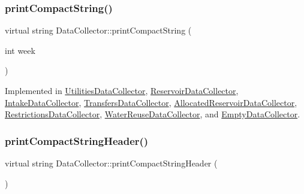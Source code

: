 \mbox{\label{classDataCollector_a2eac264fa5612aed5a830b12de4f4ae3}} 
\subsubsection{\texorpdfstring{print\+Compact\+String()}{printCompactString()}}
{\footnotesize\ttfamily virtual string Data\+Collector\+::print\+Compact\+String (\begin{DoxyParamCaption}\item[{int}]{week }\end{DoxyParamCaption})\hspace{0.3cm}{\ttfamily [pure virtual]}}



Implemented in \mbox{\hyperlink{classUtilitiesDataCollector_a57b5f9cd8ddf54154476749ab0977355}{Utilities\+Data\+Collector}}, \mbox{\hyperlink{classReservoirDataCollector_a0b68d7fa4a6d704350340d1ac3e8a1d2}{Reservoir\+Data\+Collector}}, \mbox{\hyperlink{classIntakeDataCollector_ac39a40726fd4fe887425b24a10f04034}{Intake\+Data\+Collector}}, \mbox{\hyperlink{classTransfersDataCollector_aa5385877143c67a4d300032160239cfe}{Transfers\+Data\+Collector}}, \mbox{\hyperlink{classAllocatedReservoirDataCollector_a35f8125d428e65c737ff3360ae9bd0cd}{Allocated\+Reservoir\+Data\+Collector}}, \mbox{\hyperlink{classRestrictionsDataCollector_ab8b8c30dca6b2e41c1ef5e3ac7e29813}{Restrictions\+Data\+Collector}}, \mbox{\hyperlink{classWaterReuseDataCollector_a6b37aa4b2031cf0a1a1326da2bd64420}{Water\+Reuse\+Data\+Collector}}, and \mbox{\hyperlink{classEmptyDataCollector_ad4a4ebbf610b3939e34442795a392dd5}{Empty\+Data\+Collector}}.

\mbox{\label{classDataCollector_a98dcb4ec871d9c7fbf7545c64e5ccc67}} 
\subsubsection{\texorpdfstring{print\+Compact\+String\+Header()}{printCompactStringHeader()}}
{\footnotesize\ttfamily virtual string Data\+Collector\+::print\+Compact\+String\+Header (\begin{DoxyParamCaption}{ }\end{DoxyParamCaption})\hspace{0.3cm}{\ttfamily [pure virtual]}}



